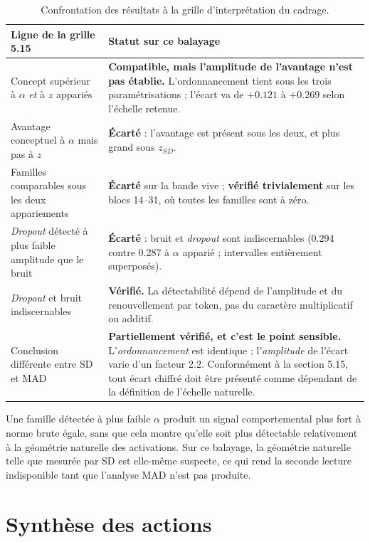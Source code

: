 \documentclass[11pt,a4paper]{article}
\begin{document}
\begin{table}[h]
\centering
\caption{Confrontation des résultats à la grille d'interprétation du cadrage.}
\begin{tabular}{p{}p{}}
\toprule
Ligne de la grille 5.15 & Statut sur ce balayage \\
\midrule
Concept supérieur à $\alpha$ \emph{et} à $z$ appariés
& \textbf{Compatible, mais l'amplitude de l'avantage n'est pas établie.}
  L'ordonnancement tient sous les trois paramétrisations ; l'écart va de
  $+\num{0.121}$ à $+\num{0.269}$ selon l'échelle retenue. \\
\addlinespace
Avantage conceptuel à $\alpha$ mais pas à $z$
& \textbf{Écarté} : l'avantage est présent sous les deux, et plus grand sous $z_{SD}$. \\
\addlinespace
Familles comparables sous les deux appariements
& \textbf{Écarté} sur la bande vive ; \textbf{vérifié trivialement} sur les blocs 14--31,
  où toutes les familles sont à zéro. \\
\addlinespace
\emph{Dropout} détecté à plus faible amplitude que le bruit
& \textbf{Écarté} : bruit et \emph{dropout} sont indiscernables
  (\num{0.294} contre \num{0.287} à $\alpha$ apparié ; intervalles entièrement
  superposés). \\
\addlinespace
\emph{Dropout} et bruit indiscernables
& \textbf{Vérifié.} La détectabilité dépend de l'amplitude et du renouvellement par
  token, pas du caractère multiplicatif ou additif. \\
\addlinespace
Conclusion différente entre SD et MAD
& \textbf{Partiellement vérifié, et c'est le point sensible.} L'\emph{ordonnancement} est
  identique ; l'\emph{amplitude} de l'écart varie d'un facteur \num{2.2}. Conformément à
  la section 5.15, tout écart chiffré doit être présenté comme dépendant de la définition
  de l'échelle naturelle. \\
\bottomrule
\end{tabular}
\end{table}

\noindent
Une famille détectée à plus faible $\alpha$ produit un signal comportemental plus fort à
norme brute égale, sans que cela montre qu'elle soit plus détectable relativement à la
géométrie naturelle des activations. Sur ce balayage, la géométrie naturelle telle que
mesurée par SD est elle-même suspecte, ce qui rend la seconde lecture indisponible tant
que l'analyse MAD n'est pas produite.

\section{Synthèse des actions}
\end{document}
